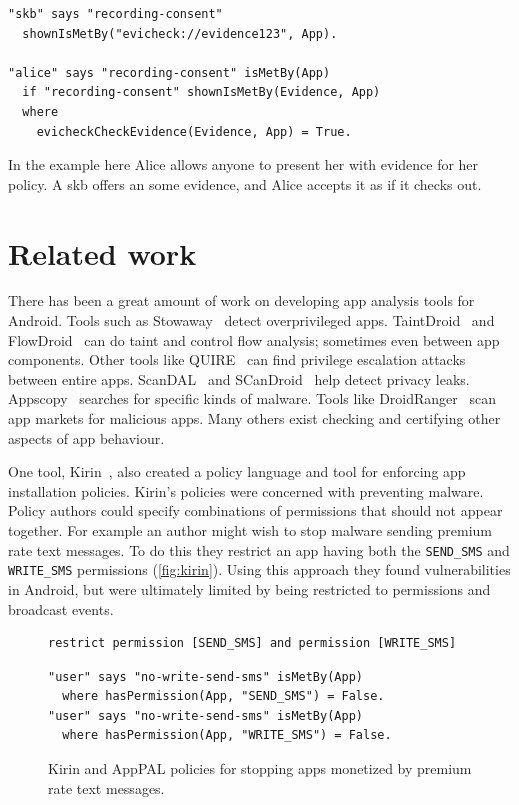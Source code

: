 \documentclass[a4paper]{scrartcl}
\newcommand{\comment}[1]{}%
\begin{document}
\begin{description}
\begin{lstlisting}
"skb" says "recording-consent" 
  shownIsMetBy("evicheck://evidence123", App).

"alice" says "recording-consent" isMetBy(App)
  if "recording-consent" shownIsMetBy(Evidence, App)
  where
    evicheckCheckEvidence(Evidence, App) = True. 
    \end{lstlisting}
    In the example here Alice allows anyone to present her with evidence for her policy.
    A \ac{skb} offers an some evidence, and Alice accepts it as if it checks out.
\end{description}

\section{Related work \comment{1--2 pages}}

There has been a great amount of work on developing app analysis tools for Android.  
Tools such as Stowaway~\citep{Felt:2011kj} detect overprivileged apps.
TaintDroid~\citep{Enck:2010uw} and FlowDroid~\citep{Fritz:2013vi} can do taint and control flow analysis; sometimes even between app components.
Other tools like QUIRE~\citep{Bugiel:2012ui} can find privilege escalation attacks between entire apps.
ScanDAL~\citep{Kim:2012vt} and SCanDroid~\citep{Fuchs:2009vi} help detect privacy leaks.
Appscopy~\citep{Feng:kPGZr_ja} searches for specific kinds of malware.
Tools like DroidRanger~\citep{Zhou:2012tb} scan app markets for malicious apps. 
Many others exist checking and certifying other aspects of app behaviour.

One tool, Kirin~\citep{Enck:2009ko}, also created a policy language and tool for enforcing app installation policies.
Kirin's policies were concerned with preventing malware.
Policy authors could specify combinations of permissions that should not appear together.
For example an author might wish to stop malware sending premium rate text messages.
To do this they restrict an app having both the \texttt{SEND\_SMS} and \texttt{WRITE\_SMS} permissions (\autoref{fig:kirin}).
Using this approach they found vulnerabilities in Android, but were ultimately limited by being restricted to permissions and broadcast events.
\begin{figure}
\begin{lstlisting}
restrict permission [SEND_SMS] and permission [WRITE_SMS]
\end{lstlisting}
\begin{lstlisting}
"user" says "no-write-send-sms" isMetBy(App)
  where hasPermission(App, "SEND_SMS") = False.
"user" says "no-write-send-sms" isMetBy(App)
  where hasPermission(App, "WRITE_SMS") = False.
\end{lstlisting}
\caption{Kirin and AppPAL policies for stopping apps monetized by premium rate text messages.}
\label{fig:kirin}
\end{figure}
\end{document}
